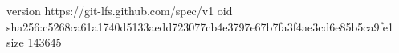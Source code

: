 version https://git-lfs.github.com/spec/v1
oid sha256:c5268ca61a1740d5133aedd723077cb4e3797e67b7fa3f4ae3cd6e85b5ca9fe1
size 143645

